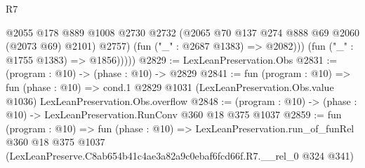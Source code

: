 \begin{lexlean}{R7}
\begin{coremodule}
                @2055
                  @178
                  @889
                  @1008
                  @2730
                  @2732
                  (@2065 @70 @137 @274 @888 @69 @2060 (@2073 @69) @2101)
                  @2757)
                (fun ("_" : @2687 @1383) => @2082)))
            (fun ("_" : @1755 @1383) => @1856)))))
@2829 := LexLeanPreservation.Obs
@2831 := (program : @10) -> (phase : @10) -> @2829
@2841 := fun (program : @10) =>
  fun (phase : @10) =>
  cond.{1} @2829 @1031 (LexLeanPreservation.Obs.value @1036) LexLeanPreservation.Obs.overflow
@2848 := (program : @10) -> (phase : @10) -> LexLeanPreservation.RunConv @360 @18 @375 @1037
@2859 := fun (program : @10) =>
  fun (phase : @10) =>
  LexLeanPreservation.run_of_funRel
    @360
    @18
    @375
    @1037
    (LexLeanPreserve.C8ab654b41c4ae3a82a9c0ebaf6fcd66f.R7.__rel_0 @324 @341)
\end{coremodule}
\end{lexlean}

